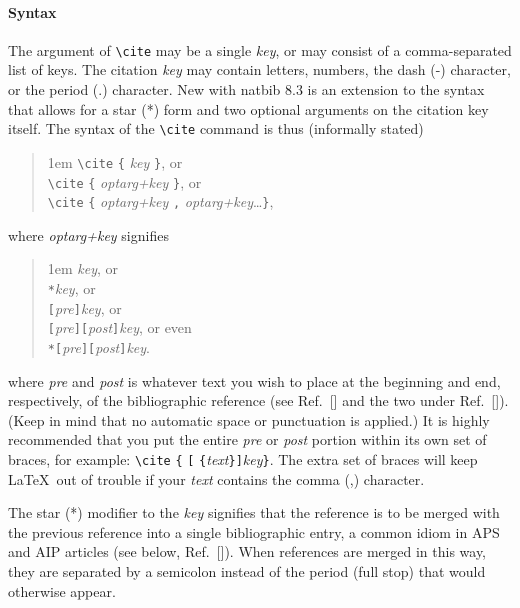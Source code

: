 \documentclass[%
 reprint,
 amsmath,amssymb,
 aps,
]{revtex4-2}
\begin{document}
\paragraph{Syntax}
The argument of \verb+\cite+ may be a single \emph{key}, 
or may consist of a comma-separated list of keys.
The citation \emph{key} may contain 
letters, numbers, the dash (-) character, or the period (.) character. 
New with natbib 8.3 is an extension to the syntax that allows for 
a star (*) form and two optional arguments on the citation key itself.
The syntax of the \verb+\cite+ command is thus (informally stated)
\begin{quotation}\flushleft\leftskip1em
\verb+\cite+ \verb+{+ \emph{key} \verb+}+, or\\
\verb+\cite+ \verb+{+ \emph{optarg+key} \verb+}+, or\\
\verb+\cite+ \verb+{+ \emph{optarg+key} \verb+,+ \emph{optarg+key}\ldots \verb+}+,
\end{quotation}\noindent
where \emph{optarg+key} signifies 
\begin{quotation}\flushleft\leftskip1em
\emph{key}, or\\
\texttt{*}\emph{key}, or\\
\texttt{[}\emph{pre}\texttt{]}\emph{key}, or\\
\texttt{[}\emph{pre}\texttt{]}\texttt{[}\emph{post}\texttt{]}\emph{key}, or even\\
\texttt{*}\texttt{[}\emph{pre}\texttt{]}\texttt{[}\emph{post}\texttt{]}\emph{key}.
\end{quotation}\noindent
where \emph{pre} and \emph{post} is whatever text you wish to place 
at the beginning and end, respectively, of the bibliographic reference
(see Ref.~[] and the two under Ref.~[]).
(Keep in mind that no automatic space or punctuation is applied.)
It is highly recommended that you put the entire \emph{pre} or \emph{post} portion 
within its own set of braces, for example: 
\verb+\cite+ \verb+{+ \texttt{[} \verb+{+\emph{text}\verb+}+\texttt{]}\emph{key}\verb+}+.
The extra set of braces will keep \LaTeX\ out of trouble if your \emph{text} contains the comma (,) character.

The star (*) modifier to the \emph{key} signifies that the reference is to be 
merged with the previous reference into a single bibliographic entry, 
a common idiom in APS and AIP articles (see below, Ref.~[]). 
When references are merged in this way, they are separated by a semicolon instead of 
the period (full stop) that would otherwise appear.
\end{document}
